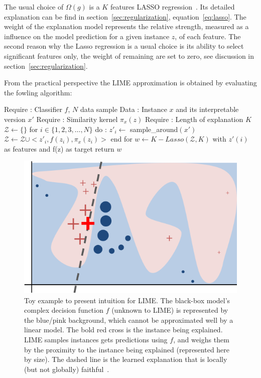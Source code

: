 The usual choice of $\Omega(g)$ is a $K$ features LASSO regression~\cite{LASSO}. Its detailed explanation can be find in section~\ref{sec:regularization}, equation~\ref{eq:lasso}.
The weight of the explanation model represents the relative strength, measured as a influence on the model prediction for a given instance $z$, of each feature. The second reason why the Lasso regression is a usual choice is its ability to select significant features only, the weight of remaining are set to zero, see discussion in section~\ref{sec:regularization}. 

From the practical perspective the LIME approximation is obtained by evaluating the fowling algorithm:

\begin{algorithm}[caption={Model explanation using LIME}, label={alg:LIME}]
Require : Classifier $f$, $N$ data sample
Data :  Instance $x$ and its interpretable version $x'$
Require : Similarity kernel $\pi_x(z)$
Require :  Length of explanation $K$
$\mathcal{Z} \leftarrow \{\}$
for  $i \in \{ 1, 2, 3, \ldots, N \}$ do : 
   $z'_{i} \leftarrow$ sample_around$(x')$
   $\mathcal{Z}  \leftarrow  \mathcal{Z} \cup  < z'_i, f(z_i),\pi_x(z_i) > $ 
   end for
$w \leftarrow  K-Lasso(\mathcal{Z}, K)$ with $z'(i)$ as features and f(z) as target
return $w$
\end{algorithm}

\begin{figure}
\centering
\includegraphics[scale=0.7]{figures/lime.png}
\caption{Toy example to present intuition for LIME. The black-box model's complex decision function $f$ (unknown to LIME) is represented by the blue/pink background, which cannot be approximated well by a linear model. The bold red cross is the instance
being explained. LIME samples instances gets predictions using $f$, and weighs them by the proximity to the instance being explained (represented here by size). The dashed line is the learned explanation that is locally (but not globally) faithful~\cite{lime}. 
\label{fig:lime}}
\end{figure} 


